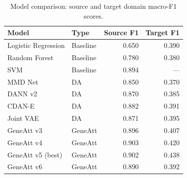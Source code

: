\begin{table}
\caption{Model comparison: source and target domain macro-F1 scores.}
\label{tab:model_comparison}
\begin{tabular}{llrr}
\toprule
Model & Type & Source F1 & Target F1 \\
\midrule
Logistic Regression & Baseline & 0.650 & 0.390 \\
Random Forest & Baseline & 0.780 & 0.380 \\
SVM & Baseline & 0.894 & — \\
MMD Net & DA & 0.850 & 0.370 \\
DANN v2 & DA & 0.870 & 0.385 \\
CDAN-E & DA & 0.882 & 0.391 \\
Joint VAE & DA & 0.871 & 0.395 \\
GeneAtt v3 & GeneAtt & 0.896 & 0.407 \\
GeneAtt v4 & GeneAtt & 0.903 & 0.420 \\
GeneAtt v5 (best) & GeneAtt & 0.902 & 0.438 \\
GeneAtt v6 & GeneAtt & 0.890 & 0.392 \\
\bottomrule
\end{tabular}
\end{table}
